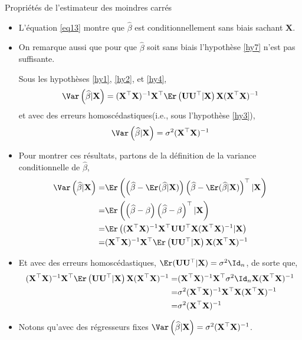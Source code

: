 \begin{frame}[allowframebreaks]{Propriétés de l'estimateur des moindres carrés}
\begin{itemize}
\item L'équation \eqref{eq13} montre que $\widehat{\beta}$ est conditionnellement sans biais sachant $\mathbf{X}$. \item On remarque aussi que pour que $\widehat{\beta}$ soit sans biais l'hypothèse \ref{hy7} n'est pas suffisante.
\begin{proposition}
Sous les hypothèses \ref{hy1}, \ref{hy2}, et \ref{hy4},
\begin{align*}
\Var\left(\widehat{\beta} | \mathbf{X}\right) = (\mathbf{X}^\top\mathbf{X})^{-1}\mathbf{X}^\top\Er\left(\mathbf{U}\mathbf{U}^\top | \mathbf{X}\right)\mathbf{X}(\mathbf{X}^\top\mathbf{X})^{-1}
\end{align*}
et avec des erreurs homoscédastiques(i.e., sous l'hypothèse \ref{hy3}),
\begin{align*}
\Var\left(\widehat{\beta} | \mathbf{X}\right) = \sigma^2(\mathbf{X}^\top\mathbf{X})^{-1}
\end{align*}
\end{proposition}
\item Pour montrer ces résultats, partons de la définition de la variance conditionnelle de $\widehat{\beta}$,
\begin{align*}
\Var\left(\widehat{\beta} | \mathbf{X}\right) =& \Er\left(\left(\widehat{\beta} - \Er(\widehat{\beta} | \mathbf{X})\right) \left(\widehat{\beta} - \Er(\widehat{\beta} | \mathbf{X})\right)^\top | \mathbf{X}\right)\\
=&\Er\left(\left(\widehat{\beta} - \beta\right) \left(\widehat{\beta} - \beta\right) ^\top | \mathbf{X}\right)\\
=&\Er\left((\mathbf{X}^\top\mathbf{X})^{-1}\mathbf{X}^\top\mathbf{U}\mathbf{U}^\top\mathbf{X}(\mathbf{X}^\top\mathbf{X})^{-1}|\mathbf{X}\right)\\
=&(\mathbf{X}^\top\mathbf{X})^{-1}\mathbf{X}^\top\Er\left(\mathbf{U}\mathbf{U}^\top | \mathbf{X}\right)\mathbf{X}(\mathbf{X}^\top\mathbf{X})^{-1}
\end{align*}
\item Et avec des erreurs homoscédastiques, $\Er(\mathbf{U}\mathbf{U}^\top| \mathbf{X}) = \sigma^2\Id_n$, de sorte que,
\begin{align*}
(\mathbf{X}^\top\mathbf{X})^{-1}\mathbf{X}^\top\Er\left(\mathbf{U}\mathbf{U}^\top | \mathbf{X}\right)\mathbf{X}(\mathbf{X}^\top\mathbf{X})^{-1} =& (\mathbf{X}^\top\mathbf{X})^{-1}\mathbf{X}^\top \sigma^2\Id_n \mathbf{X}(\mathbf{X}^\top\mathbf{X})^{-1}\\
=& \sigma^2(\mathbf{X}^\top\mathbf{X})^{-1}\mathbf{X}^\top\mathbf{X}(\mathbf{X}^\top\mathbf{X})^{-1}\\
=&\sigma^2(\mathbf{X}^\top\mathbf{X})^{-1}
\end{align*}
\item Notons qu'avec des régresseurs fixes $\Var\left(\widehat{\beta} | \mathbf{X}\right) =  \sigma^2(\mathbf{X}^\top\mathbf{X})^{-1}$.


\end{itemize}
\end{frame}
